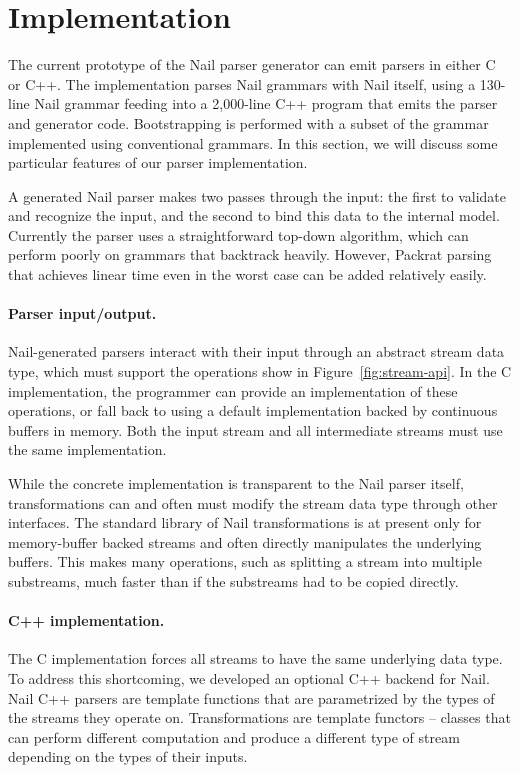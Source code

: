 \section{Implementation}
\label{s:impl}

The current prototype of the Nail parser generator can emit parsers in either C or C++. The implementation parses Nail grammars with Nail itself, using a
130-line Nail grammar feeding into a 2,000-line C++ program that
emits the parser and generator code. Bootstrapping is
performed with a subset of the grammar implemented using conventional grammars. 
In this section, we will discuss some particular features of our parser
implementation.


A generated Nail parser makes two passes through the input: the first to
validate and recognize the input, and the second to bind this data to the internal
model. Currently the parser uses a straightforward top-down algorithm, which can perform poorly on
grammars that backtrack heavily. However, Packrat
parsing~\cite{packrat-parsing:icfp02} that achieves linear time even in the worst case can be added relatively easily.

\paragraph{Parser input/output.}
Nail-generated parsers interact with their input through an abstract stream data type, which must support the operations show in Figure~\ref{fig:stream-api}. In the C implementation, the programmer can provide an implementation of these operations, or fall back to using a default implementation backed by continuous buffers in memory. Both the input stream and all intermediate streams must use the same implementation.

While the concrete implementation is transparent to the Nail parser itself, transformations can and often must modify the stream data type through other interfaces. The standard library of Nail transformations is at present only for memory-buffer backed streams and often directly manipulates the underlying buffers. This makes many operations, such as splitting a stream into multiple substreams, much faster than if the substreams had to be copied directly. 


\paragraph{C++ implementation.}
The C implementation forces all streams to have the same underlying data type. To address this shortcoming, we developed an optional C++ backend for Nail. Nail C++ parsers are template functions that are parametrized by the types of the streams they operate on. Transformations are template functors -- classes that can perform different computation  and produce a different type of stream depending on the types of their inputs.

